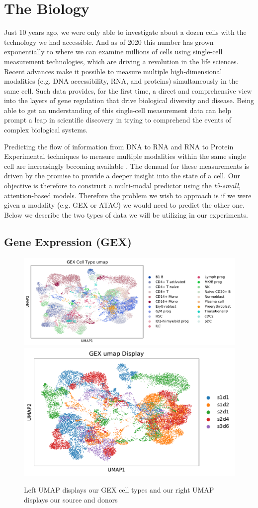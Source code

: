 \section{The Biology}

Just 10 years ago, we were only able to investigate about a dozen cells with the technology we had accessible. 
And as of 2020 this number has grown exponentially to where we can examine millions of cells using single-cell measurement technologies, which are driving a revolution in the life sciences. 
Recent advances make it possible to measure multiple high-dimensional modalities (e.g. DNA accessibility, RNA, and proteins) simultaneously in the same cell. Such data provides, for the first time, a direct and comprehensive view into the layers of gene regulation that drive biological diversity and disease. 
Being able to get an understanding of this single-cell measurement data can help prompt a leap in scientific discovery in trying to comprehend the events of complex biological systems. 

Predicting the flow of information from DNA to RNA and RNA to Protein Experimental techniques to measure multiple modalities within the same single cell are increasingly becoming available \cite{five}. 
The demand for these measurements is driven by the promise to provide a deeper insight into the state of a cell. 
Our objective is therefore to construct a multi-modal predictor using the \emph{t5-small}, attention-based models. 
Therefore the problem we wish to approach is if we were given a modality (e.g. GEX or ATAC) we would need to predict the other one. Below we describe the two types of data we will be utilizing in our experiments.

\subsection{Gene Expression (GEX)}
\begin{figure}[H]
\centering
\includegraphics[width=.5\textwidth]{figures/umap_GEX_ct.pdf}
\includegraphics[width=.35\textwidth]{figures/umap_GEX.pdf}
\caption{Left UMAP displays our GEX cell types and our right UMAP displays our source and donors}
\end{figure}

